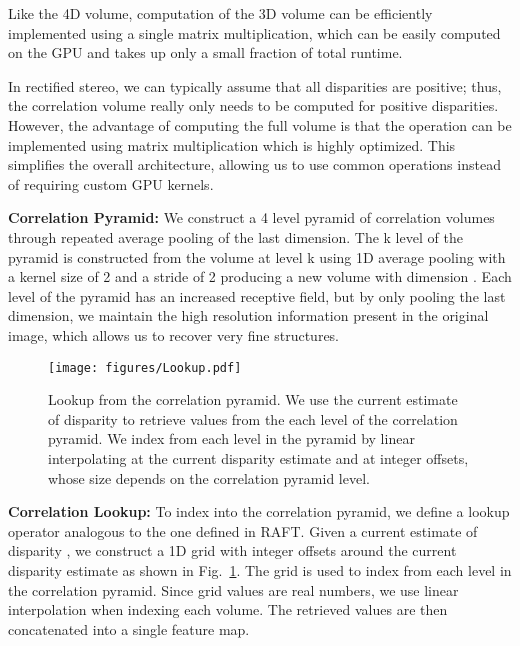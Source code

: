 \documentclass[10pt,twocolumn,letterpaper]{article}
\begin{document}
Like the 4D volume, computation of the 3D volume can be efficiently implemented using a single matrix multiplication, which can be easily computed on the GPU and takes up only a small fraction of total runtime. 

In rectified stereo, we can typically assume that all disparities are positive; thus, the correlation volume really only needs to be computed for positive disparities. However, the advantage of computing the full volume is that the operation can be implemented using matrix multiplication which is highly optimized. This simplifies the overall architecture, allowing us to use common operations instead of requiring custom GPU kernels. 




\vspace{1mm}
\noindent\textbf{Correlation Pyramid:} We construct a 4 level pyramid of correlation volumes through repeated average pooling of the last dimension. The k level of the pyramid is constructed from the volume at level k using 1D average pooling with a kernel size of 2 and a stride of 2 producing a new volume  with dimension . Each level of the pyramid has an increased receptive field, but by only pooling the last dimension, we maintain the high resolution information present in the original image, which allows us to recover very fine structures.



\vspace{1mm}


\begin{figure}[t]
    \centering
	\texttt{[image: figures/Lookup.pdf]}
	\caption{Lookup from the correlation pyramid. We use the current estimate of disparity to retrieve values from the each level of the correlation pyramid. We index from each level in the pyramid by linear interpolating at the current disparity estimate and at integer offsets, whose size depends on the correlation pyramid level.}\vspace{-2mm}
	\label{fig:lookup}
\end{figure}


\noindent\textbf{Correlation Lookup:} To index into the correlation pyramid, we define a lookup operator  analogous to the one defined in RAFT. Given a current estimate of disparity , we construct a 1D grid with integer offsets around the current disparity estimate as shown in Fig.~\ref{fig:lookup}. The grid is used to index from each level in the correlation pyramid. Since grid values are real numbers, we use linear interpolation when indexing each volume. The retrieved values are then concatenated into a single feature map.
\end{document}
